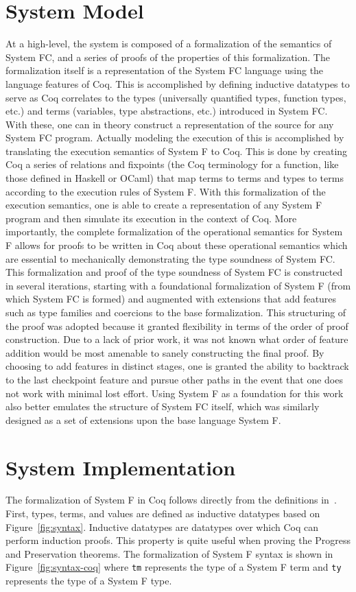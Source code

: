 \documentclass{sig-alternate}
\begin{document}
\section{System Model}
At a high-level, the system is composed of a formalization of the semantics of System FC, and a series of proofs of the properties of this formalization. The formalization itself is a representation of the System FC language using the language features of Coq. This is accomplished by defining inductive datatypes to serve as Coq correlates to the types (universally quantified types, function types, etc.) and terms (variables, type abstractions, etc.) introduced in System FC.  With these, one can in theory construct a representation of the source for any System FC program. Actually modeling the execution of this is accomplished by translating the execution semantics of System F to Coq. This is done by creating Coq a series of relations and fixpoints (the Coq terminology for a function, like those defined in Haskell or OCaml) that map terms to terms and types to terms according to the execution rules of System F. With this formalization of the execution semantics, one is able to create a representation of any System F program and then simulate its execution in the context of Coq. More importantly, the complete formalization of the operational semantics for System F allows for proofs to be written in Coq about these operational semantics which are essential to mechanically demonstrating the type soundness of System FC.
This formalization and proof of the type soundness of System FC is constructed in several iterations, starting with a foundational formalization of System F (from which System FC is formed) and augmented with extensions that add features such as type families and coercions to the base formalization. This structuring of the proof was adopted because it granted flexibility in terms of the order of proof construction. Due to a lack of prior work, it was not known what order of feature addition would be most amenable to sanely constructing the final proof. By choosing to add features in distinct stages, one is granted the ability to backtrack to the last checkpoint feature and pursue other paths in the event that one does not work with minimal lost effort. Using System F as a foundation for this work also better emulates the structure of System FC itself, which was similarly designed as a set of extensions upon the base language System F.

\section{System Implementation}
The formalization of System F in Coq follows directly from the definitions in~\cite{Pierce:TAPL}. First, types, terms, and values are defined as inductive datatypes based on Figure~\ref{fig:syntax}. Inductive datatypes are datatypes over which Coq can perform induction proofs. This property is quite useful when proving the Progress and Preservation theorems. The formalization of System F syntax is shown in Figure~\ref{fig:syntax-coq} where \texttt{tm} represents the type of a System F term and \texttt{ty} represents the type of a System F type.
\end{document}
